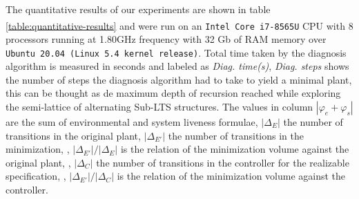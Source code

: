 The quantitative results of our experiments are shown in table 
\ref{table:quantitative-results} and were run on an 
\texttt{Intel\textsuperscript{\textregistered} Core\textsuperscript{\texttrademark}
 i7-8565U} CPU with 8 processors running at 1.80GHz frequency
with 32 Gb of RAM memory over \texttt{Ubuntu 20.04 (Linux 5.4 kernel release)}.
Total time taken by the diagnosis algorithm is measured in seconds and
labeled as \emph{Diag. time(s)}, \emph{Diag. steps} shows the number of steps the diagnosis algorithm had to take to yield a minimal plant, this can be thought as de maximum depth of recursion reached while exploring the semi-lattice of alternating Sub-LTS structures.  The values in column $|\varphi_e + \varphi_s|$ are the sum of environmental and system liveness formulae, $|\Delta_{E}|$ the number of transitions in the original plant, $|\Delta_{E'}|$ the number of transitions in the minimization,
, $|\Delta_{E'}|/|\Delta_{E}|$ is the relation of the minimization volume against the original plant, , $|\Delta_{C}|$ the number of transitions in the controller for the realizable specification,
, $|\Delta_{E'}|/|\Delta_{C}|$ is the relation of the minimization volume against the controller.

